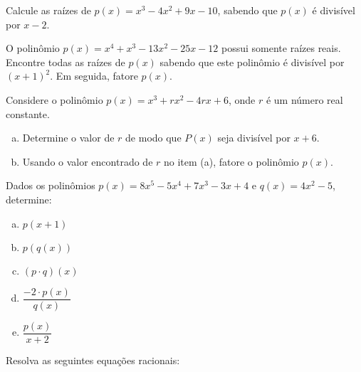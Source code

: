 \begin{secExercicios}
    \begin{exer}
        Calcule as raízes de $p(x)=x^3-4x^2+9x-10$, sabendo que $p(x)$ é divisível por $x-2$.
    \end{exer}

    \begin{exer}
        O polinômio $p(x)= x^4+x^3-13x^2-25x -12$ possui somente raízes reais.  Encontre todas as raízes de $p(x)$ sabendo que este polinômio é divisível por $(x+1)^2$. Em seguida, fatore $p(x)$.
    \end{exer}
    
    \begin{exer}
    Considere o polinômio $p(x)=x^3 +r x^2 -4rx +6$, onde $r$ é um número real constante.
    \begin{enumerate}[a)]
        \item Determine o valor de $r$ de modo que $P(x)$ seja divisível por $x+6$.
        \item Usando o valor encontrado de $r$ no item (a), fatore o polinômio $p(x)$.
    \end{enumerate}
    \end{exer}
    
    \begin{exer}
        Dados os polinômios $p(x)=8x^5-5x^4+7x^3-3x+4$ e $q(x)=4x^2-5$, determine:
        \begin{multicols}{2}
            \begin{enumerate}[a)]
                \item $p(x+1)$
                \item $p(q(x))$
                \item $(p\cdot q)(x)$
                \item $\dfrac{-2 \cdot p(x)}{q(x)}$
                \item $\dfrac{p(x)}{x+2}$
            \end{enumerate}
        \end{multicols}
    \end{exer}
    \begin{resp}
    \end{resp}

    \begin{exer}
    Resolva as seguintes equações racionais:
    

\end{exer}
\end{secExercicios}
